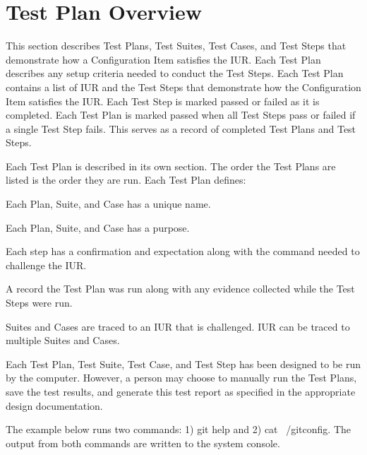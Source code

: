 \newpage
\section{Test Plan Overview}
This section describes Test Plans, Test Suites, Test Cases, and Test Steps that
demonstrate how a Configuration Item satisfies the IUR.  Each Test Plan
describes any setup criteria needed to conduct the Test Steps. Each Test Plan
contains a list of IUR and the Test Steps that demonstrate how the Configuration
Item satisfies the IUR. Each Test Step is marked passed or failed as it is
completed.  Each Test Plan is marked passed when all Test Steps pass or failed
if a single Test Step fails.  This serves as a record of completed Test Plans
and Test Steps.

Each Test Plan is described in its own section.  The order the Test Plans
are listed is the order they are run.  Each Test Plan defines:

\begin{description}[labelindent=25pt, style=multiline, leftmargin=4.0cm]

\item[name]
  Each Plan, Suite, and Case has a unique name.

\item[purpose]
  Each Plan, Suite, and Case has a purpose.

\item[Test Steps]
  Each step has a confirmation and expectation along with the command needed to
  challenge the IUR.

\item[Objective Evidence]
  A record the Test Plan was run along with any evidence collected while the
  Test Steps were run.

\item[Traceability]
  Suites and Cases are traced to an IUR that is challenged. IUR can be traced to
  multiple Suites and Cases.

\end{description}

Each Test Plan, Test Suite, Test Case,  and Test Step has been designed to be
run by the computer. However, a person may choose to manually run the Test
Plans, save the test results, and generate this test report as specified in the
appropriate design documentation.

The example below runs two commands: 1) git help and 2) cat ~/gitconfig.  The
output from both commands are written to the system console.


